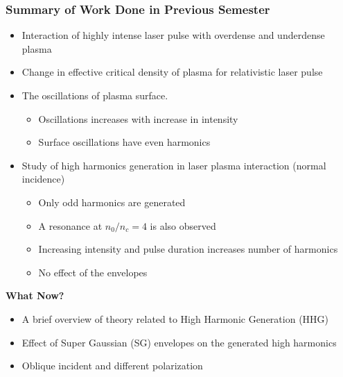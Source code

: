 \documentclass{beamer}
\begin{document}
\begin{frame}
    \frametitle{Summary of Work Done in Previous Semester}
    \small
    \begin{itemize}
        \item Interaction of highly intense laser pulse with overdense and underdense plasma
        \item Change in effective critical density of plasma for relativistic laser pulse
        \item The oscillations of plasma surface.
              \begin{itemize}
                  \item Oscillations increases with increase in intensity
                  \item Surface oscillations have even harmonics
              \end{itemize}
        \item Study of high harmonics generation in laser plasma interaction (normal incidence)
              \begin{itemize}
                  \item Only odd harmonics are generated
                  \item A resonance at $n_0/n_c=4$ is also observed
                  \item Increasing intensity and pulse duration increases number of harmonics
                  \item No effect of the envelopes
              \end{itemize}
    \end{itemize}

    \textbf{What Now?}
    \begin{itemize}
        \item A brief overview of theory related to High Harmonic Generation (HHG)
        \item Effect of Super Gaussian (SG) envelopes on the generated high harmonics
        \item Oblique incident and different polarization
    \end{itemize}
\end{frame}
\end{document}

